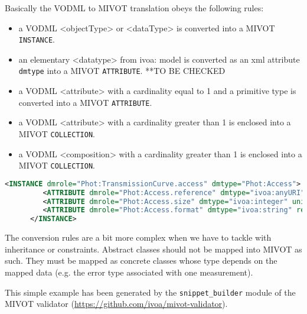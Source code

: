 Basically the VODML to MIVOT translation obeys the following rules:
\begin{itemize}
    \item a VODML <objectType> or <dataType> is converted into a MIVOT \texttt{INSTANCE}. 
    \item an elementary <datatype> from ivoa: model is converted as an xml attribute \texttt{dmtype} into a MIVOT \texttt{ATTRIBUTE}. 
    **TO BE CHECKED 
    \item a VODML <attribute> with a cardinality equal to 1 and a primitive type 
          is converted into a MIVOT \texttt{ATTRIBUTE}. 
    \item a VODML <attribute> with a cardinality greater than 1 is enclosed into a MIVOT \texttt{COLLECTION}. 
    \item a VODML <composition> with a cardinality greater than 1 is enclosed into a MIVOT \texttt{COLLECTION}.     
\end{itemize} 

\begin{lstlisting}[caption={MIVOT instanciation of the PhotDM class \texttt{Access}. 
VODML attributes are mapped as simple \texttt{ATTRIBUTE}s since their cardinality is equal to 
1 and they have primitive types. In this example, automatically 
generated, \texttt{ATTRIBUTE}s come with both \texttt{@ref} and \texttt{@value}. Using one, the other or both 
depends on the actual data being annotated (see \ref{ATTRIBUTE}). 
The cryptic  "@@@@@" label is a tag used by the annoter tool to indicate a place holder for column reference. It must be replaced with the actual name of the table column (reference to a \texttt{FIELD} id or name, actually) to be used to set the \texttt{ATTRIBUTE} values.
},language=XML]
      <INSTANCE dmrole="Phot:TransmissionCurve.access" dmtype="Phot:Access">
         <ATTRIBUTE dmrole="Phot:Access.reference" dmtype="ivoa:anyURI" ref="@@@@@" value=""/>
         <ATTRIBUTE dmrole="Phot:Access.size" dmtype="ivoa:integer" unit="" ref="@@@@@" value=""/>
         <ATTRIBUTE dmrole="Phot:Access.format" dmtype="ivoa:string" ref="@@@@@" value=""/>
      </INSTANCE>
\end{lstlisting}  

The conversion rules are a bit more complex when we have to tackle with inheritance or constraints.
Abstract classes should not be mapped into MIVOT as such. They must be mapped as concrete classes 
whose type depends on the mapped data (e.g. the error type associated with one measurement).

This simple example has been generated by the \texttt{snippet\_builder} module of the MIVOT validator 
(\url{https://github.com/ivoa/mivot-validator}).

